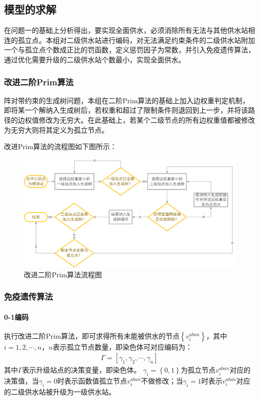 \documentclass{whutmod}
\begin{document}
    	\subsection{模型的求解}
    	在问题一的基础上分析得出，要实现全面供水，必须消除所有无法与其他供水站相连的孤立点。本组对二级供水站进行编码，对无法满足约束条件的二级供水站附加一个与孤立点个数成正比的罚函数，定义惩罚因子为常数，并引入免疫遗传算法，通过优化需要升级的二级供水站个数最小，实现全面供水。
    	  	\subsubsection{改进二阶Prim算法}
    	阵对带约束的生成树问题，本组在二阶Prim算法的基础上加入边权重判定机制，即将某一个解纳入生成树后，若权重和超过了限制条件则退回到上一步，并将该路径的边权值修改为无穷大。在此基础上，若某个二级节点的所有边权重值都被修改为无穷大则将其定义为孤立节点。
    	
    	改进Prim算法的流程图如下图所示：
        \begin{figure}[H]
        	\centering
        	\includegraphics[width=\textwidth]{figures/a3.png}
        	\caption{改进二阶Prim算法流程图}\label{asd}
        \end{figure}
        
    		
  	
  	\subsubsection{免疫遗传算法}
  	\paragraph{0-1编码}
  	执行改进二阶Prim算法，即可求得所有未能被供水的节点$\left \{ v_i^{aban} \right \}$，其中$i=1,2,\cdots,n$，$n$表示孤立节点数量，即染色体可对应编码为：
  		\begin{gather}
  		\Gamma =[\gamma_1,\gamma_2,\cdots, \gamma_n]
  		\end{gather}
    其中$\Gamma$表示升级站点的决策变量，即染色体。 $\gamma_i=\left \{ 0,1 \right \}$为孤立节点$v_i^{aban}$对应的决策值，当$\gamma_i=0$时表示函数值孤立节点$v_i^{aban}$不做修改；当$\gamma_i=1$时表示$v_i^{aban}$对应的二级供水站被升级为一级供水站。
\end{document}
